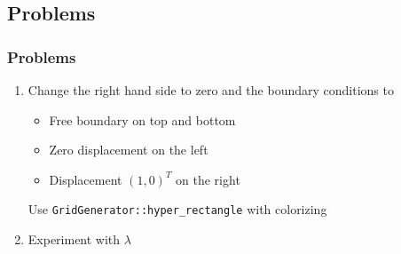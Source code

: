 \subsection{Problems}
\begin{frame}
  \frametitle{Problems}
  \begin{enumerate}
  \item Change the right hand side to zero and the boundary conditions to
    \begin{itemize}
    \item Free boundary on top and bottom
    \item Zero displacement on the left
    \item Displacement $(1,0)^T$ on the right
    \end{itemize}
    Use \lstinline!GridGenerator::hyper_rectangle! with colorizing
  \item Experiment with $\lambda$
  \end{enumerate}
\end{frame}


